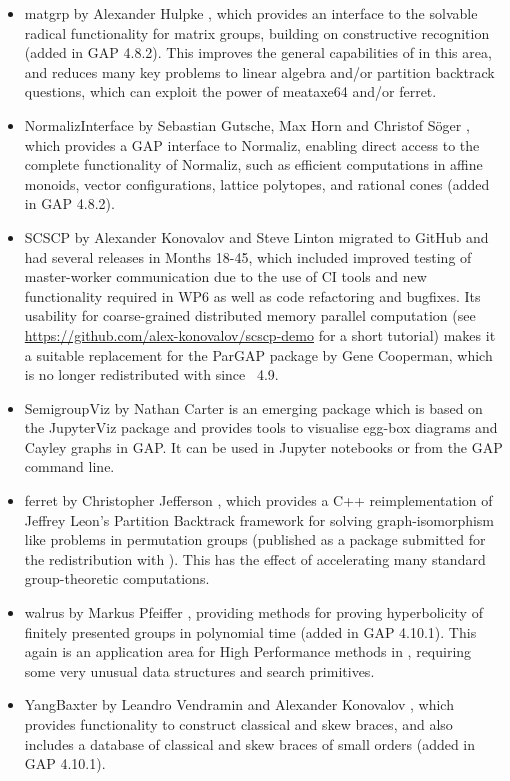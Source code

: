 \begin{itemize}
\item
{\sf matgrp}  by Alexander Hulpke \cite{matgrp}, which provides an interface
to the solvable radical functionality for matrix groups, building on
constructive recognition (added in GAP 4.8.2). This improves the
general capabilities of \GAP in this area, and reduces many key
problems to linear algebra and/or partition backtrack questions, which
can exploit the power of {\sf meataxe64} and/or {\sf ferret}.

\item
{\sf NormalizInterface} by Sebastian Gutsche, Max Horn and
Christof S\"oger \cite{NormalizInterface}, which provides a GAP interface to Normaliz, enabling
direct access to the complete functionality of Normaliz, such as efficient
computations in affine monoids, vector configurations, lattice
polytopes, and rational cones (added in GAP 4.8.2). 

\item
{\sf SCSCP} by Alexander Konovalov and Steve Linton \cite{SCSCP}
migrated to GitHub and had several releases
in Months 18-45, which included improved testing of 
master-worker communication due to the use of
CI tools and new functionality required in WP6 as well as
code refactoring and bugfixes. Its usability for 
coarse-grained distributed memory parallel computation
(see \url{https://github.com/alex-konovalov/scscp-demo}
for a short tutorial) makes it a suitable replacement for the {\sf ParGAP}
package by Gene Cooperman, which is no longer redistributed 
with \GAP since \GAP~4.9.

\item
{\sf SemigroupViz} by Nathan Carter \cite{SemigroupViz} is an emerging
package which is based on the {\sf JupyterViz} package \cite{JupyterViz}
and provides tools to visualise egg-box diagrams and Cayley graphs in
GAP. It can be used in Jupyter notebooks or from the GAP command line.

\item
{\sf ferret} by Christopher Jefferson \cite{ferret}, which provides a C++
reimplementation of Jeffrey Leon's Partition Backtrack framework for
solving graph-isomorphism like problems in permutation groups
(published as a package submitted for the redistribution with
\GAP). This has the effect of accelerating many standard
group-theoretic computations.

%
%

\item
{\sf walrus} by Markus Pfeiffer \cite{walrus}, providing methods for proving 
hyperbolicity of finitely presented groups in polynomial time
(added in GAP 4.10.1). This again is an application area for High
Performance methods in \GAP, requiring some very unusual data
structures and search primitives.

\item
{\sf YangBaxter} by Leandro Vendramin and Alexander Konovalov \cite{YangBaxter}, 
which provides functionality to construct classical and 
skew braces, and also includes a database of classical 
and skew braces of small orders (added in GAP 4.10.1).

\end{itemize}
